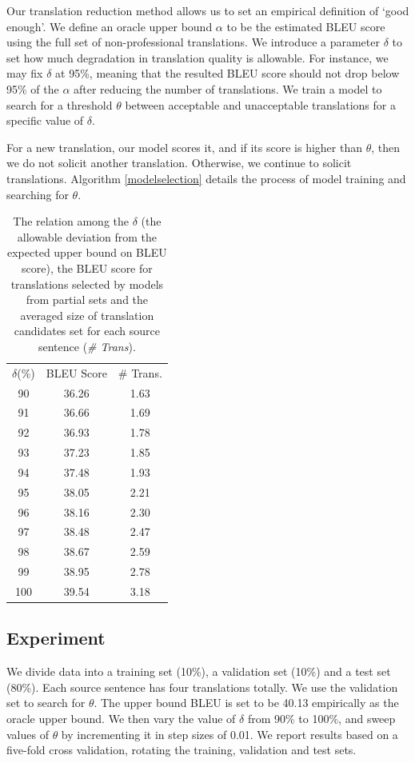 \documentclass[11pt,letterpaper]{article}
\begin{document}
Our translation reduction method allows us to set an empirical definition of `good enough'.  
We define an oracle upper bound $\alpha$ to be the estimated BLEU score using the full set of non-professional translations.
We introduce a parameter $\delta$ to set how much degradation in translation quality is allowable.  For instance, we may fix $\delta$ at 95\%, meaning that the resulted BLEU score should not drop below 95\% of the $\alpha$ after reducing the number of translations.   We train a model to search for a threshold $\theta$ between acceptable and unacceptable translations for a specific value of $\delta$. 

For a new translation, our model scores it, and if its score is higher than $\theta$, then we do not solicit another translation. Otherwise, we continue to solicit translations.  Algorithm \ref{modelselection} details the process of model training and searching for $\theta$. 


 \begin{table}
 \center
\begin{tabular}{c|c|c}
\hline
$\delta$(\%) & BLEU Score & \# Trans. \\ \hhline{===}
90    & 36.26      & 1.63            \\
91    & 36.66      & 1.69             \\
92    & 36.93      & 1.78             \\
93    & 37.23      & 1.85             \\
94    & 37.48      & 1.93             \\
95    & 38.05      & 2.21             \\
96    & 38.16      & 2.30             \\
97    & 38.48      & 2.47             \\
98    & 38.67      & 2.59             \\
99    & 38.95      & 2.78             \\
100   & 39.54      & 3.18             \\ \hline
\end{tabular}
\caption{The relation among the $\delta$ (the allowable deviation from the expected upper bound on BLEU score), the BLEU score for translations selected by models from partial sets and the averaged size of translation candidates set for each source sentence (\textit{\# Trans}).  }
    \label{orderanother}
\end{table}


\subsection{Experiment}
 We divide data into a training set (10\%), a validation set (10\%) and a test set (80\%). Each source sentence has four translations totally. We use the validation set to search for $\theta$.  The upper bound BLEU is set to be 40.13 empirically as the oracle upper bound. 
We then vary the value of $\delta$ from 90\% to 100\%, and sweep values of $\theta$ by incrementing it in step sizes of 0.01.
We report results based on a five-fold cross validation, rotating the training, validation and test sets.
\end{document}
